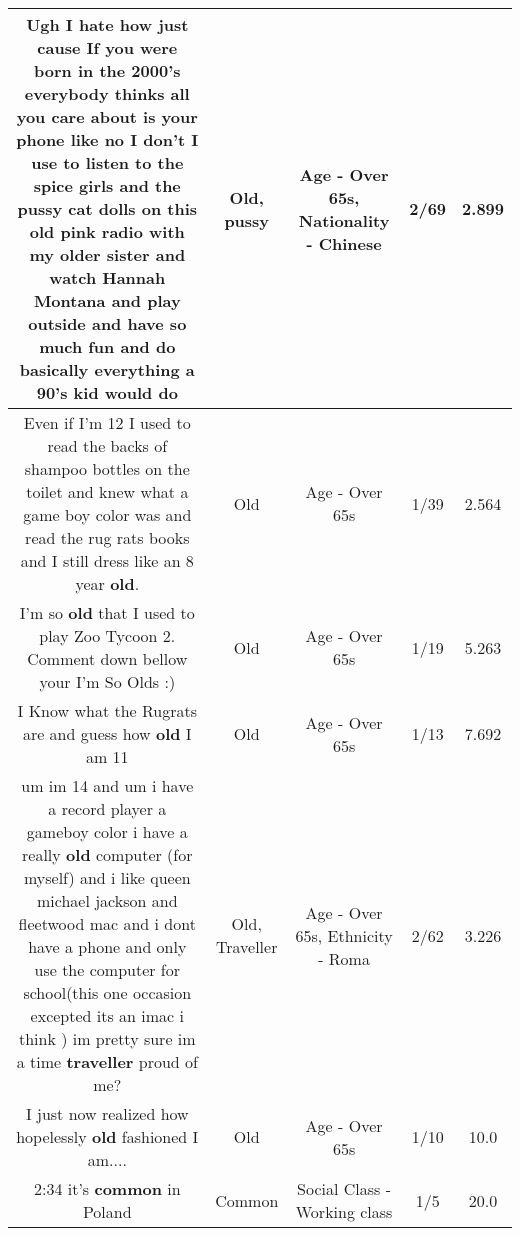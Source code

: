 \documentclass[11pt]{article}
\newlength\mylength
\begin{document}
\begin{center}
\begin{longtable}{|C{.65\mylength}|C{.30\mylength}|C{.12\mylength}|C{.12\mylength}|C{.12\mylength}|}
  \small Ugh I hate how just cause If you were born in the 2000's everybody thinks all you care about is your phone like no I don't I use to listen to the spice girls and the \textbf{pussy} cat dolls on this \textbf{old} pink radio with my older sister and watch Hannah Montana and play outside and have so much fun and do basically everything a 90's kid would do\normalsize   & Old, pussy & Age - Over 65s, Nationality - Chinese & 2/69 & 2.899 \\  \hline
  \small Even if I'm 12 I used to read the backs of shampoo bottles on the toilet and knew what a game boy color was and read the rug rats books and I still dress like an 8 year \textbf{old}.\normalsize   & Old & Age - Over 65s & 1/39 & 2.564 \\  \hline
  \small I'm so \textbf{old} that I used to play Zoo Tycoon 2. Comment down bellow your I'm So Olds :)\normalsize   & Old & Age - Over 65s & 1/19 & 5.263 \\  \hline
  \small I Know what the Rugrats are and guess how \textbf{old} I am 11\normalsize   & Old & Age - Over 65s & 1/13 & 7.692 \\  \hline
  \small um im 14 and um i have a record player a gameboy color i have a really \textbf{old} computer (for myself) and i like queen michael jackson and fleetwood mac and i dont have a phone and only use the computer for school(this one occasion excepted its an imac i think )  im pretty sure im a time \textbf{traveller} proud of me?\normalsize   & Old, Traveller & Age - Over 65s, Ethnicity - Roma & 2/62 & 3.226 \\  \hline
  \small I just now realized how hopelessly \textbf{old} fashioned I am....\normalsize   & Old & Age - Over 65s & 1/10 & 10.0 \\  \hline
  \small 2:34 it's \textbf{common} in Poland\normalsize   & Common & Social Class - Working class & 1/5 & 20.0 \\  \hline

\end{longtable}
\end{center}
\end{document}
